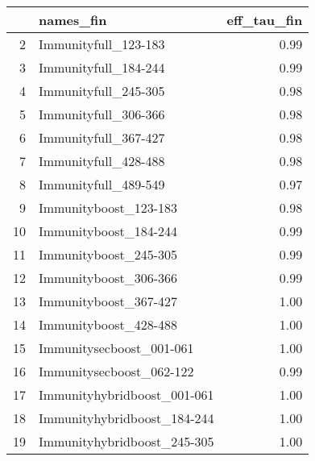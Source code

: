 \begin{table}[ht]
\centering
\begin{tabular}{rlr}
  \hline
 & names\_fin & eff\_tau\_fin \\ 
  \hline
2 & Immunityfull\_123-183 & 0.99 \\ 
  3 & Immunityfull\_184-244 & 0.99 \\ 
  4 & Immunityfull\_245-305 & 0.98 \\ 
  5 & Immunityfull\_306-366 & 0.98 \\ 
  6 & Immunityfull\_367-427 & 0.98 \\ 
  7 & Immunityfull\_428-488 & 0.98 \\ 
  8 & Immunityfull\_489-549 & 0.97 \\ 
  9 & Immunityboost\_123-183 & 0.98 \\ 
  10 & Immunityboost\_184-244 & 0.99 \\ 
  11 & Immunityboost\_245-305 & 0.99 \\ 
  12 & Immunityboost\_306-366 & 0.99 \\ 
  13 & Immunityboost\_367-427 & 1.00 \\ 
  14 & Immunityboost\_428-488 & 1.00 \\ 
  15 & Immunitysecboost\_001-061 & 1.00 \\ 
  16 & Immunitysecboost\_062-122 & 0.99 \\ 
  17 & Immunityhybridboost\_001-061 & 1.00 \\ 
  18 & Immunityhybridboost\_184-244 & 1.00 \\ 
  19 & Immunityhybridboost\_245-305 & 1.00 \\ 
   \hline
\end{tabular}
\end{table}
